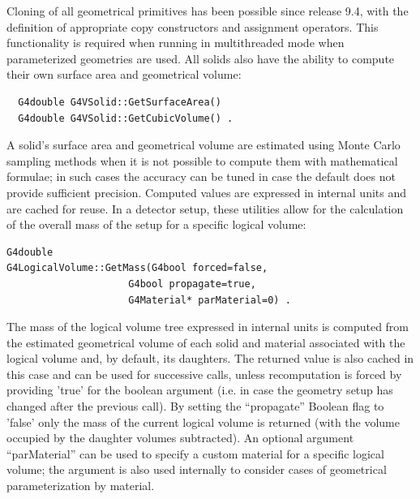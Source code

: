 Cloning of all geometrical primitives has been possible since release 9.4, 
with the definition of appropriate copy constructors and assignment operators.
This functionality is required when running in multithreaded mode when 
parameterized geometries are used.  All solids also have the ability to compute
their own surface area and geometrical volume:
\begin{verbatim}
  G4double G4VSolid::GetSurfaceArea()
  G4double G4VSolid::GetCubicVolume() .
\end{verbatim}
A solid's surface area and geometrical volume are estimated using Monte Carlo
sampling methods when it is not possible to compute them with mathematical 
formulae;  in such cases the accuracy can be tuned in case the default does not
provide sufficient precision.  Computed values are expressed in internal units
and are cached for reuse.  In a detector setup, these utilities allow for the
calculation of the overall mass of the setup for a specific logical volume:
\vspace{2.0cm}

\begin{verbatim}
G4double
G4LogicalVolume::GetMass(G4bool forced=false,
                     G4bool propagate=true,
                     G4Material* parMaterial=0) .
\end{verbatim}
The mass of the logical volume tree expressed in internal units is computed
from the estimated geometrical volume of each solid and material associated
with the logical volume and, by default, its daughters.  The returned value
is also cached in this case and can be used for successive calls, unless
recomputation is forced by providing 'true' for the boolean argument (i.e. 
in case the geometry setup has changed after the previous call).  By setting
the ``propagate'' Boolean flag to 'false' only the mass of the current logical 
volume is returned (with the volume occupied by the daughter volumes 
subtracted).  An optional argument ``parMaterial'' can be used to specify a 
custom material for a specific logical volume; the argument is also used 
internally to consider cases of geometrical parameterization by material. 

